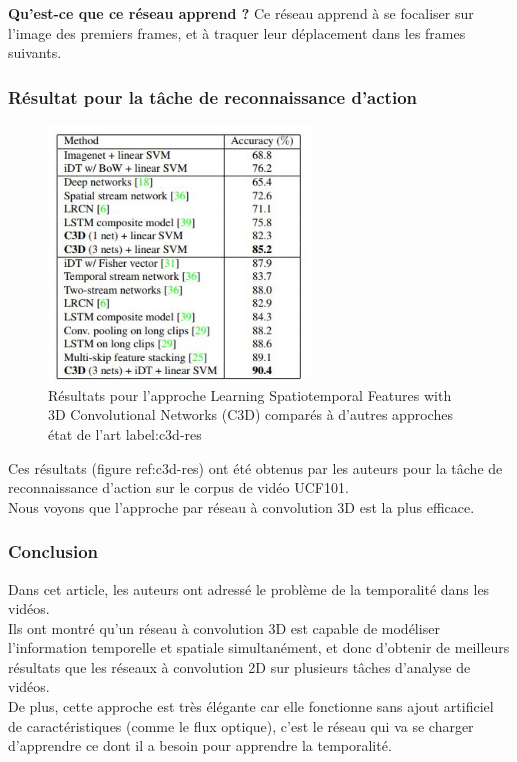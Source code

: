 \documentclass[11pt]{article}
\begin{document}
\textbf{Qu'est-ce que ce réseau apprend ?} Ce réseau apprend à se focaliser sur l'image des premiers frames, et à traquer leur déplacement dans les frames suivants.\\

\subsubsection{Résultat pour la tâche de reconnaissance d'action}
\label{sec:orgc14625d}
\begin{figure}[htbp]
\centering
\includegraphics[width=7cm]{c3d_result.jpg}
\caption{Résultats pour l'approche Learning Spatiotemporal Features with 3D Convolutional Networks (C3D) comparés à d'autres approches état de l'art label:c3d-res}
\end{figure}
Ces résultats (figure ref:c3d-res) ont été obtenus par les auteurs pour la tâche de reconnaissance d'action sur le corpus de vidéo UCF101.\\
Nous voyons que l'approche par réseau à convolution 3D est la plus efficace.\\

\subsubsection{Conclusion}
\label{sec:org482e53c}
Dans cet article, les auteurs ont adressé le problème de la temporalité dans les vidéos.\\
Ils ont montré qu'un réseau à convolution 3D est capable de modéliser l'information temporelle et spatiale simultanément, et donc d'obtenir de meilleurs résultats que les réseaux à convolution 2D sur plusieurs tâches d'analyse de vidéos.\\
De plus, cette approche est très élégante car elle fonctionne sans ajout artificiel de caractéristiques (comme le flux optique), c'est le réseau qui va se charger d'apprendre ce dont il a besoin pour apprendre la temporalité.\\
\end{document}
